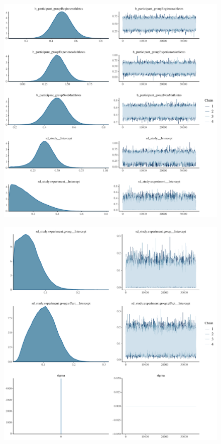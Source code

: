 \documentclass[
]{report}
\begin{document}
\begin{figure}

{\centering \includegraphics[width=1\textwidth,height=\textheight]{diagnostic_plots_files/figure-pdf/unnamed-chunk-8-1.pdf}

}

\end{figure}

\begin{figure}

{\centering \includegraphics[width=1\textwidth,height=\textheight]{diagnostic_plots_files/figure-pdf/unnamed-chunk-8-2.pdf}

}

\end{figure}
\end{document}
